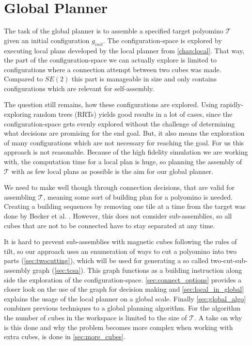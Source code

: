 \chapter{Global Planner}
\label{chap:global}

The task of the global planner is to assemble a specified target polyomino $\mathcal{T}$ given an initial configuration $g_{init}$.
The configuration-space is explored by executing local plans developed by the local planner from \autoref{chap:local}.
That way, the part of the configuration-space we can actually explore is limited to configurations where a connection attempt between two cubes was made.
Compared to $SE(2)$ this part is manageable in size and only contains configurations which are relevant for self-assembly.

The question still remains, how these configurations are explored.
Using rapidly-exploring random trees (RRTs) \cite{lavalle1998} yields good results in a lot of cases, since the configuration-space gets evenly explored without the challenge of determining what decisions are promising for the end goal.
But, it also means the exploration of many configurations which are not necessary for reaching the goal.
For us this approach is not reasonable. 
Because of the high fidelity simulation we are working with, the computation time for a local plan is huge, so planning the assembly of $\mathcal{T}$ with as few local plans as possible is the aim for our global planner.

We need to make well though through connection decisions, that are valid for assembling $\mathcal{T}$, meaning some sort of building plan for a polyomino is needed.
Creating a building sequences by removing one tile at a time from the target was done by Becker et al. \cite{Becker2020}.
However, this does not consider sub-assemblies, so all cubes that are not to be connected have to stay separated at any time.

It is hard to prevent sub-assemblies with magnetic cubes following the rules of tilt, so our approach uses an enumeration of ways to cut a polyomino into two parts (\autoref{sec:twocutting}), which will be used for generating a so called two-cut-sub-assembly graph (\autoref{sec:tcsa}).
This graph functions as a building instruction along side the exploration of the configuration-space.
\autoref{sec:connect_options} provides a closer look on the use of the graph for decision making and \autoref{sec:local_in_global} explains the usage of the local planner on a global scale. 
Finally \autoref{sec:global_algo} combines previous techniques to a global planning algorithm.
For the algorithm the number of cubes in the workspace is limited to the size of $\mathcal{T}$.
A take on why is this done and why the problem becomes more complex when working with extra cubes, is done in \autoref{sec:more_cubes}.



